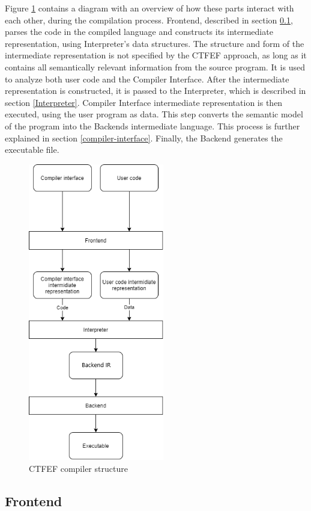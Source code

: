 Figure \ref{CTFE-first-compiler-structure} contains a diagram with an overview of how these parts interact with each other, during the compilation process.
Frontend, described in section \ref{Frontend}, parses the code in the compiled language and constructs its intermediate representation, using Interpreter's data structures.
The structure and form of the intermediate representation is not specified by the CTFEF approach, as long as it contains all semantically relevant information from the source program.
It is used to analyze both user code and the Compiler Interface.
After the intermediate representation is constructed, it is passed to the Interpreter, which is described in section \ref{Interpreter}.
Compiler Interface intermediate representation is then executed, using the user program as data.
This step converts the semantic model of the program into the Backends intermediate language.
This process is further explained in section \ref{compiler-interface}.
Finally, the Backend generates the executable file.

\begin{figure}
	\centering
	\includegraphics[height=13cm]{pictures/compiler-structure.png}
	\caption{CTFEF compiler structure}
	\label{CTFE-first-compiler-structure}
\end{figure}

\subsection{Frontend}
\label{Frontend}

